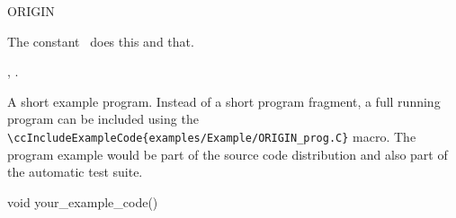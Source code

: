 

\begin{ccRefConstant}{ORIGIN}  %


\ccDefinition
  
The constant \ccRefName\ does this and that.



\ccSeeAlso

,
.

\ccExample

A short example program.
Instead of a short program fragment, a full running program can be
included using the 
\verb|\ccIncludeExampleCode{examples/Example/ORIGIN_prog.C}| 
macro. The program example would be part of the source code distribution and
also part of the automatic test suite.

\begin{ccExampleCode}
void your_example_code() {
}
\end{ccExampleCode}


\end{ccRefConstant}


